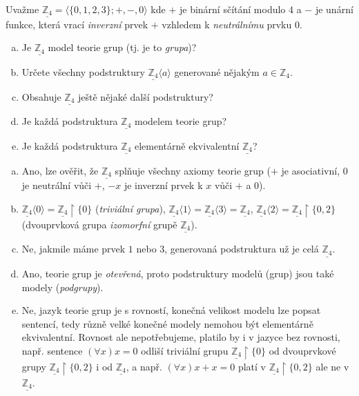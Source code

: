 \begin{problem}

    Uvažme $\underline{\mathbb Z_4}=\langle\{0,1,2,3\};+,-,0 \rangle$ kde $+$ je binární sčítání modulo $4$ a $-$ je unární funkce, která vrací \emph{inverzní} prvek $+$ vzhledem k \emph{neutrálnímu} prvku $0$.
    \begin{enumerate}[(a)]      
        \item Je $\underline{\mathbb Z_4}$ model teorie grup (tj. je to \emph{grupa})?
        \item Určete všechny podstruktury $\underline{\mathbb Z_4}\langle a\rangle$ generované nějakým $a\in \mathbb Z_4$.
        \item Obsahuje $\underline{\mathbb Z_4}$ ještě nějaké další podstruktury?
        \item Je každá podstruktura $\underline{\mathbb Z_4}$ modelem teorie grup?
        \item Je každá podstruktura $\underline{\mathbb Z_4}$ elementárně ekvivalentní $\underline{\mathbb Z_4}$?
    \end{enumerate}

    \begin{solution}

        \begin{enumerate}[(a)]
            \item Ano, lze ověřit, že $\underline{\mathbb Z_4}$ splňuje všechny axiomy teorie grup ($+$ je asociativní, $0$ je neutrální vůči $+$, $-x$ je inverzní prvek k $x$ vůči $+$ a $0$).
            \item $\underline{\mathbb Z_4}\langle 0\rangle=\underline{\mathbb Z_4}\restriction\{0\}$ (\emph{triviální grupa}), $\underline{\mathbb Z_4}\langle 1\rangle=\underline{\mathbb Z_4}\langle 3\rangle=\underline{\mathbb Z_4}$, $\underline{\mathbb Z_4}\langle 2\rangle=\underline{\mathbb Z_4}\restriction\{0,2\}$ (dvouprvková grupa \emph{izomorfní} grupě $\underline{\mathbb Z_4}$).
            \item Ne, jakmile máme prvek $1$ nebo $3$, generovaná podstruktura už je celá $\underline{\mathbb Z_4}$.
            \item Ano, teorie grup je \emph{otevřená}, proto podstruktury modelů (grup) jsou také modely (\emph{podgrupy}).
            \item Ne, jazyk teorie grup je s rovností, konečná velikost modelu lze popsat sentencí, tedy různě velké konečné modely nemohou být elementárně ekvivalentní. Rovnost ale nepotřebujeme, platilo by i v jazyce bez rovnosti, např. sentence $(\forall x)x=0$ odliší triviální grupu $\underline{\mathbb Z_4}\restriction\{0\}$ od dvouprvkové grupy $\underline{\mathbb Z_4}\restriction\{0,2\}$ i od $\underline{\mathbb Z_4}$, a např. $(\forall x)x+x=0$ platí v $\underline{\mathbb Z_4}\restriction\{0,2\}$ ale ne v $\underline{\mathbb Z_4}$.
        \end{enumerate}
                    
    \end{solution}

\end{problem}



